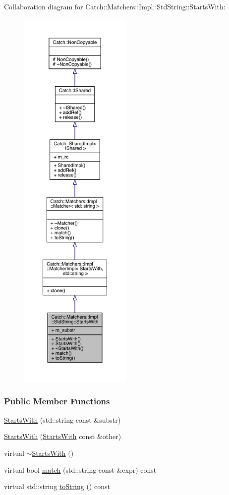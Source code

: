 Collaboration diagram for Catch\+:\+:Matchers\+:\+:Impl\+:\+:Std\+String\+:\+:Starts\+With\+:\nopagebreak
\begin{figure}[H]
\begin{center}
\leavevmode
\includegraphics[height=550pt]{a00358}
\end{center}
\end{figure}
\subsubsection*{Public Member Functions}
\begin{DoxyCompactItemize}
\item 
\hyperlink{a00076_a1940dacb184d129adb33acea73dedc17}{Starts\+With} (std\+::string const \&substr)
\item 
\hyperlink{a00076_a5526cb587632e7e46253d6f60ae01098}{Starts\+With} (\hyperlink{a00076}{Starts\+With} const \&other)
\item 
virtual \hyperlink{a00076_ad22a0d01b6c29bd4784ffff988e99992}{$\sim$\+Starts\+With} ()
\item 
virtual bool \hyperlink{a00076_ae9c893adbacc853171a488aea5355653}{match} (std\+::string const \&expr) const 
\item 
virtual std\+::string \hyperlink{a00076_a066fe10e74495cb556abc6895193ba97}{to\+String} () const 
\end{DoxyCompactItemize}
